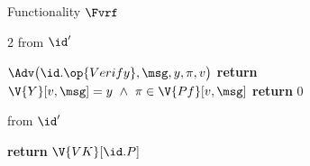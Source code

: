 \begin{interface}[nofloat]{Functionality $\Fvrf$ \\
\params{$\PID$, \quad $\Ps$, \quad $\admits$, \quad
$\uses := \{(\Adv,\serves)\}$, \quad $\pars := \ell$}}
{\begin{multicols}{2}
 \quad from $\id'$
\begin{algorithmic}[1]
\algcont
\State $\Adv\bigl(\id.\op{Verify}, \msg, y, \pi, v\bigr)$
 \label{ln:vrfknown}
  \State \textbf{return} $\V{Y}[v, \msg] = y \ \wedge\ \pi \in \V{Pf}[v, \msg]$ \label{ln:vrfsound}
\EndIf
\State \textbf{return} $0$ \label{ln:vrfunknown}
\algsave
\end{algorithmic}
\vspace{1.4ex}

 \quad from $\id'$
\begin{algorithmic}[1]
\algcont
\State \textbf{return} $\V{VK}[\id.P]$ \label{ln:vrfleak}
\algsave
\end{algorithmic}
\end{multicols}}
\end{interface}
